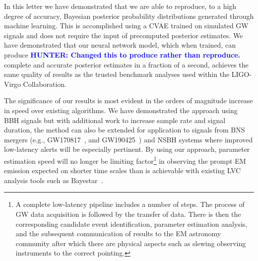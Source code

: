 \documentclass[%
showpacs,
nofootinbib,
 amsmath,amssymb,
 aps,
 twocolumn,
 prl,
 reprint,
floatfix,
]{revtex4-1}
\newcommand{\hunter}[1]{\textbf{\textcolor{blue}{HUNTER: #1}}}
\begin{document}
%
%

%
%
%
In this letter we have demonstrated that we are able to reproduce, to a high
degree of accuracy, Bayesian posterior probability distributions generated
through machine learning. This is accomplished using a \ac{CVAE} trained on
simulated \ac{GW} signals and does not require the input of precomputed
posterior estimates. We have demonstrated that our neural network model, which
when trained, can produce \hunter{Changed this to produce rather than reproduce.} complete and accurate posterior estimates in
a fraction of a second, achieves the same quality of results as the
trusted benchmark analyses used within the LIGO-Virgo Collaboration.

%
%
The significance of our results is most evident in the orders of magnitude
increase in speed over existing algorithms. We have demonstrated the approach
using \ac{BBH} signals but with additional work to increase sample rate
and signal duration, the method can also be extended for application to
signals from \ac{BNS} mergers (e.g., GW170817~\cite{PhysRevLett.119.161101},
and GW190425~\cite{2020ApJ...892L...3A}) and \ac{NSBH} systems where
improved low-latency alerts will be especially pertinent. By using our
approach, parameter estimation speed will no longer be limiting
factor\footnote{A complete low-latency pipeline includes a number of
steps. The process of \ac{GW} data acquisition is followed by the transfer of
data. There is then the corresponding candidate event identification,
parameter estimation analysis, and the subsequent communication of results to
the \ac{EM} astronomy community after which there are physical aspects such as
slewing observing instruments to the correct pointing.} in observing the prompt
\ac{EM} emission expected on shorter time scales than is achievable with
existing \ac{LVC} analysis tools such as Bayestar~\cite{2016PhRvD..93b4013S}.
\end{document}
